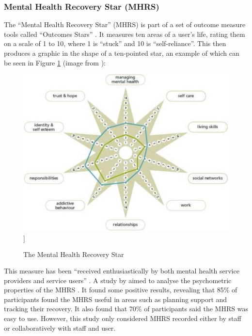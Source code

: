 \documentclass[11pt,openright,a4paper]{report}
\begin{document}
\newpage
\subsubsection{Mental Health Recovery Star (MHRS)}
The \enquote{Mental Health Recovery Star} (MHRS) is part of a set of outcome measure tools called \enquote{Outcomes Stars} \parencite{outcomesstars}. It measures ten areas of a user's life, rating them on a scale of 1 to 10, where 1 is \enquote{stuck} and 10 is \enquote{self-reliance}. This then produces a graphic in the shape of a ten-pointed star, an example of which can be seen in Figure \ref{fig:mhrs} (image from \parencite{outcomesstars}):

\begin{figure}[ht]
\centering
\caption{The Mental Health Recovery Star}
\includegraphics[width=\textwidth]{i/recoverystar.jpg}]
\label{fig:mhrs}
\end{figure}

This measure has been \enquote{received enthusiastically by both
mental health service providers and service users} \parencite{dickens2012recovery}. A study by \citeauthor{killaspy2012psychometric} aimed to analyse the psychometric properties of the MHRS \parencite{killaspy2012psychometric}. It found some positive results, revealing that 85\% of participants found the MHRS useful in areas such as planning support and tracking their recovery. It also found that 70\% of participants said the MHRS was easy to use. However, this study only considered MHRS recorded either by staff or collaboratively with staff and user.
\end{document}
